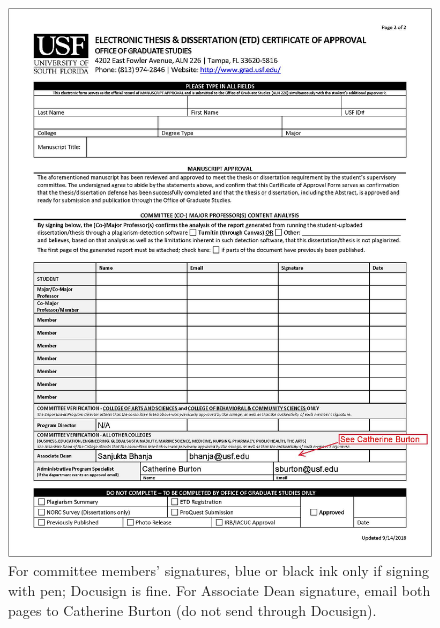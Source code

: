 \begin{figure}[htp]
    \centering
    \includegraphics{Figures/Picture2.png}
    \caption[For committee members’ signatures, blue or black ink only if signing with pen; Docusign is fine.]{For committee members’ signatures, blue or black ink only if signing with pen; Docusign is fine.  For Associate Dean signature, email both pages to Catherine Burton (do not send through Docusign).}
    \label{fig:my_label2}
\end{figure}
